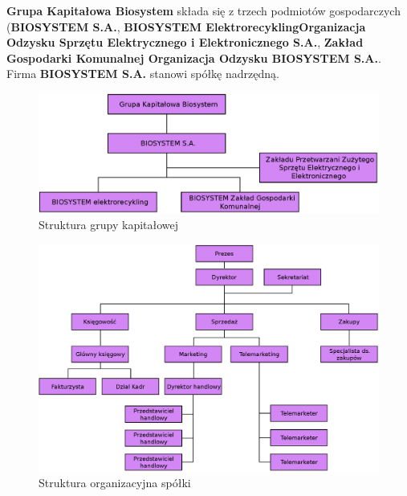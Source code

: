 

\textbf{Grupa Kapitałowa Biosystem} składa się z trzech podmiotów gospodarczych (\textbf{BIOSYSTEM S.A.}, \textbf{BIOSYSTEM ElektrorecyklingOrganizacja Odzysku Sprzętu Elektrycznego i Elektronicznego S.A.}, \textbf{Zakład Gospodarki Komunalnej Organizacja Odzysku BIOSYSTEM S.A.}. Firma \textbf{BIOSYSTEM S.A.} stanowi spółkę nadrzędną.

\begin{figure}[H]
	\centering
	\includegraphics[width=\textwidth]{img/group_chart.eps}
	\caption{Struktura grupy kapitałowej}
\end{figure}


\begin{figure}[H]
    \centering
    \includegraphics[width=1\textwidth]{img/organization_chart.eps}
    \caption{Struktura organizacyjna spółki}
\end{figure}